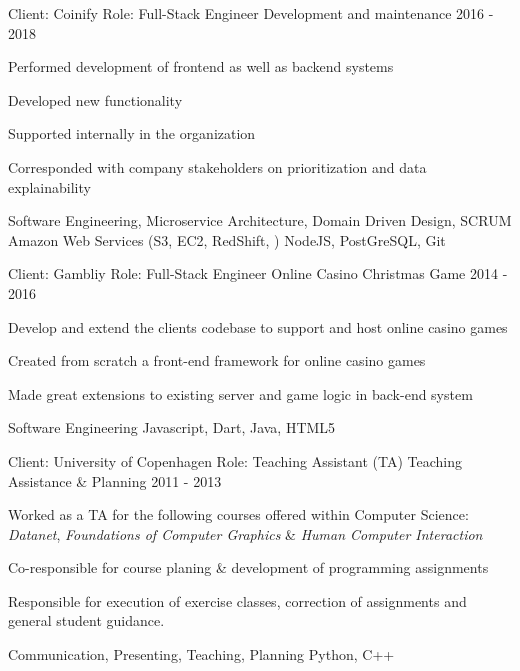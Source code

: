 \begin{cventries}
\cventry
{Client: Coinify \newline Role: Full-Stack Engineer} %
{Development and maintenance} %
{}%
{2016 - 2018} %
{ %
\begin{cvitems}
    \item {Performed development of frontend as well as backend systems}
    \item {Developed new functionality}
    \item {Supported internally in the organization}
    \item {Corresponded with company stakeholders on prioritization and data explainability}
\end{cvitems}
\cventrykeywords
{Software Engineering, Microservice Architecture, Domain Driven Design, SCRUM}
{Amazon Web Services (S3, EC2, RedShift, ) NodeJS, PostGreSQL, Git}
}

\cventry
{Client: Gambliy \newline Role: Full-Stack Engineer} %
{Online Casino Christmas Game} %
{}%
{2014 - 2016} %
{ %
\begin{cvitems}
    \item {Develop and extend the clients codebase to support and host online casino games}
    \item {Created from scratch a front-end framework for online casino games}
    \item {Made great extensions to existing server and game logic in back-end system}
\end{cvitems}
\cventrykeywords
{Software Engineering}
{Javascript, Dart, Java, HTML5}
}

\cventry
{Client: University of Copenhagen \newline Role: Teaching Assistant (TA)} %
{Teaching Assistance \& Planning} %
{}%
{2011 - 2013} %
{ %
\begin{cvitems}
    \item {Worked as a TA for the following courses offered within Computer Science: \textit{Datanet}, \textit{Foundations of Computer Graphics} \& \textit{Human Computer Interaction}}
    \item {Co-responsible for course planing \& development of programming assignments}
    \item {Responsible for execution of exercise classes, correction of assignments and general student guidance.}
\end{cvitems}
\cventrykeywords
{Communication, Presenting, Teaching, Planning}
{Python, C++}
}


\end{cventries}

